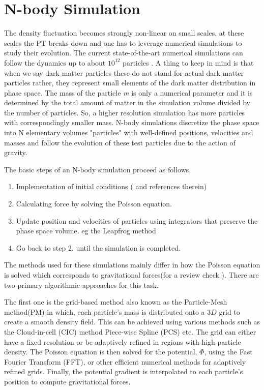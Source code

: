 \section{N-body Simulation} \label{n-body}
The density fluctuation becomes strongly non-linear on small scales, at these scales the PT breaks down and one has to leverage numerical simulations to study their evolution. The current state-of-the-art numerical simulations can follow the dynamics up to about $10^{12}$ particles \cite{Maksimova_2021}. A thing to keep in mind is that when we say dark matter particles these do not stand for actual dark matter particles rather, they represent small elements of the dark matter distribution in phase space. The mass of the particle \emph{m} is only a numerical parameter and it is determined by the total amount of matter in the simulation volume divided by the number of particles. So, a higher resolution simulation has more particles with correspondingly smaller mass. N-body simulations discretize the phase space into N elementary volumes "particles" with well-defined positions, velocities and masses and follow the evolution of these test particles due to the action of gravity.\newpage

The basic steps of an N-body simulation proceed as follows.
\begin{enumerate}
    \item Implementation of initial conditions (\cite{Michaux_2020,Sirko:2005uz} and references therein)
    \item Calculating force by solving the Poisson equation.
    \item Update position and velocities of particles using integrators that preserve the phase space volume. eg the Leapfrog method \cite{hock1981csup.book.....H}
    \item Go back to step 2. until the simulation is completed.
\end{enumerate}
The methods used for these simulations mainly differ in how the Poisson equation is solved which corresponds to gravitational forces(for a review check \cite{Trenti:2008}). There are two primary algorithmic approaches for this task.

The first one is the grid-based method also known as the Particle-Mesh method(PM) in which, each particle's mass is distributed onto a $3D$ grid to create a smooth density field. This can be achieved using various methods such as the Cloud-in-cell (CIC)\cite{CICBIRDSALL1997141} method Piece-wise Spline (PCS) etc. The grid can either have a fixed resolution or be adaptively refined in regions with high particle density. The Poisson equation is then solved for the potential, $\Phi$, using the Fast Fourier Transform (FFT)\cite{FFTPress2007}, or other efficient numerical methods for adaptively refined grids. Finally, the potential gradient is interpolated to each particle's position to compute gravitational forces. 

